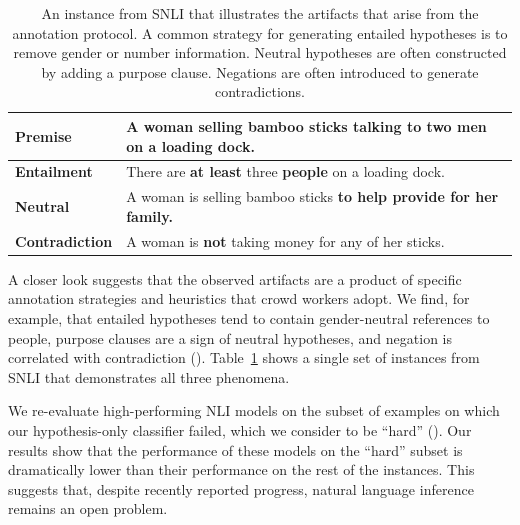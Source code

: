 \begin{table}[t]
\centering
{
\begin{tabular}{ll} \toprule
\textbf{Premise} & A woman selling bamboo sticks talking to two men on a loading dock. \\\midrule
\textbf{Entailment} & There are {\bf at least} three {\bf people} on a loading dock. \\
\textbf{Neutral} & A woman is selling bamboo sticks {\bf to help provide for her family.} \\
\textbf{Contradiction} & A woman is {\bf not} taking money for any of her sticks. \\\bottomrule
\end{tabular}
}
\caption{An instance from SNLI that illustrates the artifacts that arise from the annotation protocol. 
A common strategy for generating entailed hypotheses is to remove gender or number information. 
Neutral hypotheses are often constructed by adding a purpose clause. 
Negations are often introduced to generate contradictions.}
\label{tab:example}
\end{table}

A closer look suggests that the observed artifacts are a product of specific annotation strategies and heuristics that crowd workers adopt. %
We find, for example, that entailed hypotheses tend to contain gender-neutral references to people, purpose clauses are a sign of neutral hypotheses, and negation is correlated with contradiction (). 
Table~\ref{tab:example} shows a single set of instances from SNLI that demonstrates all three phenomena.

We re-evaluate high-performing NLI models on the subset of examples on which our hypothesis-only classifier failed, which we consider to be ``hard'' (). 
Our results show that the performance of these models on the ``hard'' subset is dramatically lower than their performance on the rest of the instances. 
This suggests that, despite recently reported progress, natural language inference remains an open problem.
